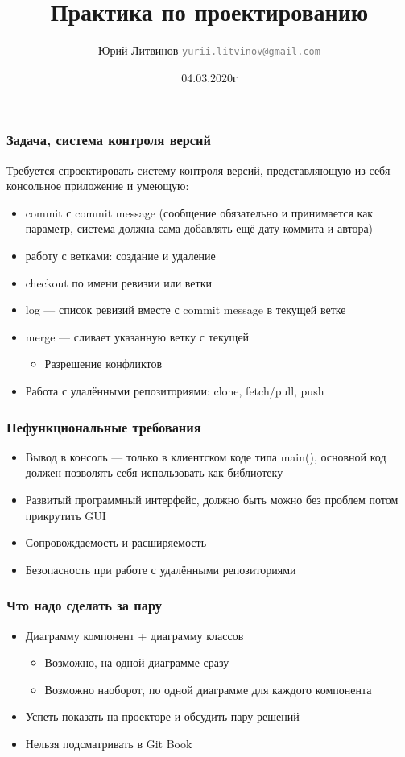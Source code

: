 \documentclass[xetex,mathserif,serif]{beamer}
\title{Практика по проектированию}
\author[Юрий Литвинов]{Юрий Литвинов \newline \textcolor{gray}{\small\texttt{yurii.litvinov@gmail.com}}}
\date{04.03.2020г}
\begin{document}
    
    \frame{\titlepage}

    \begin{frame}
        \frametitle{Задача, система контроля версий}
        Требуется спроектировать систему контроля версий, представляющую из себя консольное приложение и умеющую:
        \begin{itemize}
            \item commit с commit message (сообщение обязательно и принимается как параметр, система должна сама добавлять ещё дату коммита и автора)
            \item работу с ветками: создание и удаление
            \item checkout по имени ревизии или ветки
            \item log --- список ревизий вместе с commit message в текущей ветке
            \item merge --- сливает указанную ветку с текущей
            \begin{itemize}
                \item Разрешение конфликтов
            \end{itemize}
            \item Работа с удалёнными репозиториями: clone, fetch/pull, push
        \end{itemize}
    \end{frame}

    \begin{frame}
        \frametitle{Нефункциональные требования}
        \begin{itemize}
            \item Вывод в консоль --- только в клиентском коде типа main(), основной код должен позволять себя использовать как библиотеку
            \item Развитый программный интерфейс, должно быть можно без проблем потом прикрутить GUI
            \item Сопровождаемость и расширяемость
            \item Безопасность при работе с удалёнными репозиториями
        \end{itemize}
    \end{frame}

    \begin{frame}
        \frametitle{Что надо сделать за пару}
        \begin{itemize}
            \item Диаграмму компонент + диаграмму классов
            \begin{itemize}
                \item Возможно, на одной диаграмме сразу
                \item Возможно наоборот, по одной диаграмме для каждого компонента
            \end{itemize}
            \item Успеть показать на проекторе и обсудить пару решений
            \item Нельзя подсматривать в Git Book
        \end{itemize}
    \end{frame}
\end{document}
